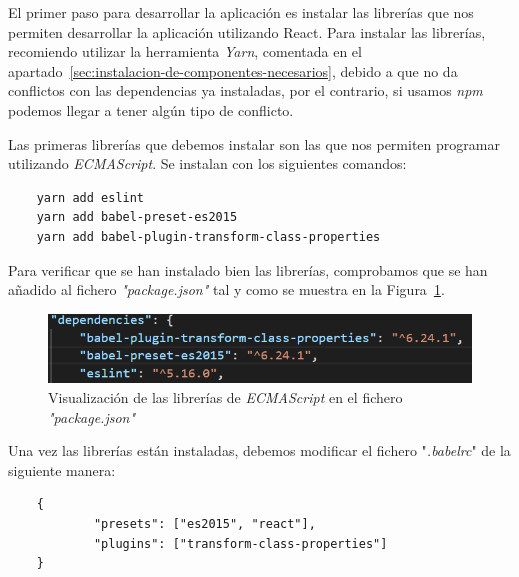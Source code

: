 \documentclass[a4paper, 12pt]{book}
\begin{document}
\vspace{5mm}
El primer paso para desarrollar la aplicación es instalar las librerías que nos permiten desarrollar la aplicación utilizando React. Para instalar las librerías, recomiendo utilizar la herramienta \textit{Yarn}, comentada en el apartado~\ref{sec:instalacion-de-componentes-necesarios}, debido a que no da conflictos con las dependencias ya instaladas, por el contrario, si usamos \textit{npm} podemos llegar a tener algún tipo de conflicto.

Las primeras librerías que debemos instalar son las que nos permiten programar utilizando \textit{ECMAScript}. Se instalan con los siguientes comandos: 
\begin{verbatim}
    yarn add eslint
    yarn add babel-preset-es2015
    yarn add babel-plugin-transform-class-properties
\end{verbatim} 
Para verificar que se han instalado bien las librerías, comprobamos que se han añadido al fichero \textit{"package.json"} tal y como se muestra en la Figura~\ref{fig:package_babelrc}.
\begin{figure}[h]
  \centering
  \includegraphics{img_usadas/package_babelrc.png}
  \caption{Visualización de las librerías de \textit{ECMAScript} en el fichero \textit{"package.json"}}
  \label{fig:package_babelrc}
\end{figure}

Una vez las librerías están instaladas, debemos modificar el fichero "\textit{.babelrc}" de la siguiente manera:
\begin{verbatim}
    {
	        "presets": ["es2015", "react"],
	        "plugins": ["transform-class-properties"]
    }
\end{verbatim}
\end{document}
